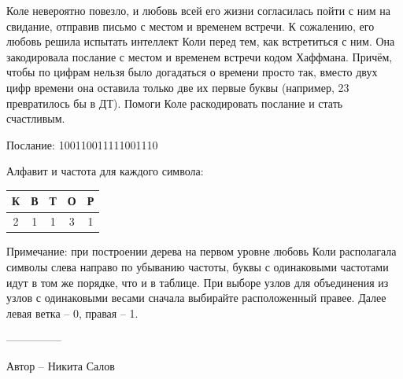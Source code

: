 \question
Коле невероятно повезло, и любовь всей его жизни согласилась пойти с ним на свидание, отправив письмо с местом и временем встречи. К сожалению, его любовь решила испытать интеллект Коли перед тем, как встретиться с ним. Она закодировала послание с местом и временем встречи кодом Хаффмана. Причём, чтобы по цифрам нельзя было догадаться о времени просто так, вместо двух цифр времени она оставила только две их первые буквы (например, 23 превратилось бы в ДТ). Помоги Коле раскодировать послание и стать счастливым.

  Послание: 100110011111001110 

Алфавит и частота для каждого символа:
\begin{center}
\begin{tabular}{|c|c|c|c|c|}
\hline
К& В& Т& О &Р\\
\hline
2& 1& 1& 3&1\\ \hline
\end{tabular}
\end{center}

Примечание: при построении дерева на первом уровне любовь Коли располагала символы слева направо по убыванию частоты, буквы с одинаковыми частотами идут в том же порядке, что и в таблице. При выборе узлов для объединения из узлов с одинаковыми весами сначала выбирайте расположенный правее. Далее левая ветка – 0, правая – 1.

---------------

Автор -- Никита Салов